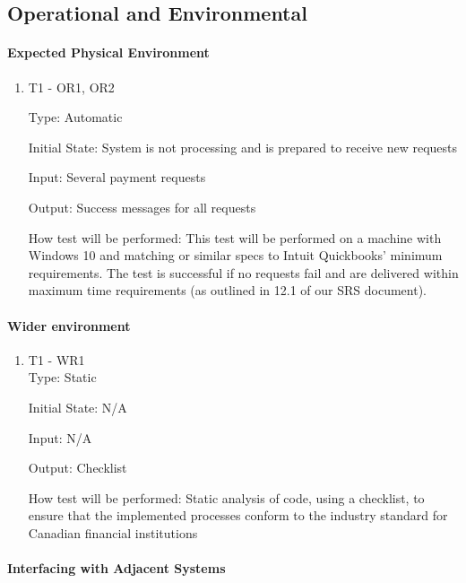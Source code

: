 \documentclass[12pt, titlepage]{article}
\begin{document}
\subsection{Operational and Environmental}

\paragraph{Expected Physical Environment}

\begin{enumerate}

\item{T1 - OR1, OR2\\}
  
Type: Automatic

Initial State: System is not processing and is prepared to receive new requests

Input: Several payment requests

Output: Success messages for all requests

How test will be performed: This test will be performed on a machine with Windows 10 and matching or similar specs to Intuit Quickbooks’ minimum requirements. The test is successful if no requests fail and are delivered within maximum time requirements (as outlined in 12.1 of our SRS document).
  
\end{enumerate}

\paragraph{Wider environment}

\begin{enumerate}

\item{T1 - WR1\\}
Type: Static

Initial State: N/A

Input: N/A

Output: Checklist 

How test will be performed: Static analysis of code, using a checklist, to ensure that the implemented processes conform to the industry standard for Canadian financial institutions
  
\end{enumerate}

\paragraph{Interfacing with Adjacent Systems}
\end{document}
